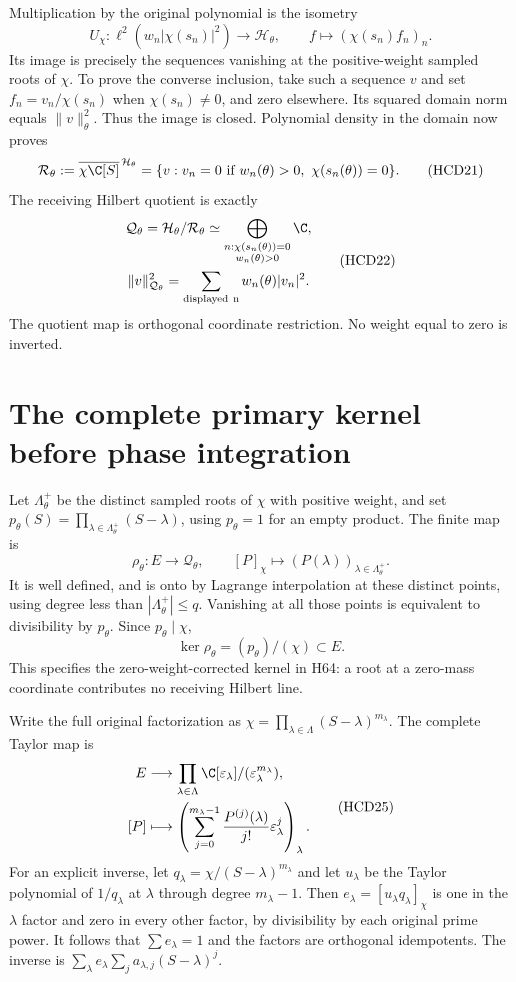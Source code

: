 Multiplication by the original polynomial is the isometry
\[
 U_\chi:\ell^2(w_n|\chi(s_n)|^2)\longrightarrow\mathcal H_\theta,
 \qquad f\longmapsto(\chi(s_n)f_n)_n.
 \tag{HCD20}
\]
Its image is precisely the sequences vanishing at the
positive-weight sampled roots of $\chi$. To prove the
converse inclusion, take such a sequence $v$ and set
$f_n=v_n/\chi(s_n)$ when $\chi(s_n)\ne0$, and zero
elsewhere. Its squared domain norm equals $\|v\|_\theta^2$.
Thus the image is closed. Polynomial density in the domain
now proves
\[
 \mathcal R_\theta:=
 \overline{\chi\C[S]}^{\,\mathcal H_\theta}
 =\{v:v_n=0\text{ if }w_n(\theta)>0,\ \chi(s_n(\theta))=0\}.
 \tag{HCD21}
\]
The receiving Hilbert quotient is exactly
\[
 \begin{gathered}
 \mathcal Q_\theta=\mathcal H_\theta/\mathcal R_\theta
 \simeq
 \bigoplus_{\substack{n:\chi(s_n(\theta))=0\\w_n(\theta)>0}}\C,\\
 \|v\|_{\mathcal Q_\theta}^2
 =\sum_{\rm displayed\ n}w_n(\theta)|v_n|^2.
 \end{gathered}
 \tag{HCD22}
\]
The quotient map is orthogonal coordinate restriction.
No weight equal to zero is inverted.

\section{The complete primary kernel before phase integration}

Let $\Lambda_\theta^+$ be the distinct sampled roots of
$\chi$ with positive weight, and set
$p_\theta(S)=\prod_{\lambda\in\Lambda_\theta^+}(S-\lambda)$,
using $p_\theta=1$ for an empty product.
The finite map is
\[
 \rho_\theta:E\longrightarrow\mathcal Q_\theta,\qquad
 [P]_\chi\longmapsto(P(\lambda))_{\lambda\in\Lambda_\theta^+}.
 \tag{HCD23}
\]
It is well defined, and is onto by Lagrange interpolation
at these distinct points, using degree less than
$|\Lambda_\theta^+|\le q$. Vanishing at all those points
is equivalent to divisibility by $p_\theta$. Since
$p_\theta\mid\chi$,
\[
 \ker\rho_\theta=(p_\theta)/(\chi)\subset E.
 \tag{HCD24}
\]
This specifies the zero-weight-corrected kernel in H64:
a root at a zero-mass coordinate contributes no receiving
Hilbert line.

Write the full original factorization as
$\chi=\prod_{\lambda\in\Lambda}(S-\lambda)^{m_\lambda}$.
The complete Taylor map is
\[
 \begin{split}
 E&\longrightarrow\prod_{\lambda\in\Lambda}
 \C[\varepsilon_\lambda]/(\varepsilon_\lambda^{m_\lambda}),\\
 [P]&\longmapsto\left(
 \sum_{j=0}^{m_\lambda-1}\frac{P^{(j)}(\lambda)}{j!}
 \varepsilon_\lambda^j\right)_\lambda.
 \end{split}
 \tag{HCD25}
\]
For an explicit inverse, let
$q_\lambda=\chi/(S-\lambda)^{m_\lambda}$ and let
$u_\lambda$ be the Taylor polynomial of $1/q_\lambda$
at $\lambda$ through degree $m_\lambda-1$.
Then $e_\lambda=[u_\lambda q_\lambda]_\chi$ is one
in the $\lambda$ factor and zero in every other factor,
by divisibility by each original prime power. It follows
that $\sum e_\lambda=1$ and the factors are orthogonal
idempotents. The inverse is
$\sum_\lambda e_\lambda\sum_j a_{\lambda,j}(S-\lambda)^j$.

